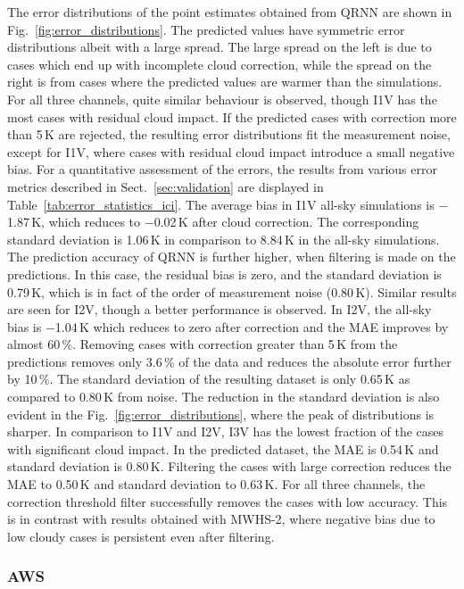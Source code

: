 \documentclass[amt, manuscript]{copernicus}
\begin{document}
The error distributions of the point estimates obtained from QRNN are shown in Fig.~\ref{fig:error_distributions}. The predicted values have symmetric error distributions albeit with a large spread. The large spread on the left is due to cases which end up with incomplete cloud correction, while the spread on the right is from cases where the predicted values are warmer than the simulations. For all three channels, quite similar behaviour is observed, though I1V has the most cases with residual cloud impact. If the predicted cases with correction more than 5\,K are rejected, the resulting error distributions fit the measurement noise, except for I1V, where cases with residual cloud impact introduce a small negative bias. For a quantitative assessment of the errors, the results from various error metrics described in  Sect.~\ref{sec:validation} are displayed in Table~\ref{tab:error_statistics_ici}. The average bias in I1V all-sky simulations is $-$1.87\,K, which reduces to $-$0.02\,K after cloud correction. The corresponding standard deviation is 1.06\,K in comparison to 8.84\,K in the all-sky simulations. The prediction accuracy of QRNN is further higher, when filtering is made on the predictions. In this case, the residual bias is zero, and the standard deviation is 0.79\,K, which is in fact of the order of measurement noise (0.80\,K). Similar results are seen for I2V, though a better performance is observed. In I2V, the all-sky bias is $-$1.04\,K which reduces to zero after correction and the MAE improves by almost 60\,\%. Removing cases with correction greater than 5\,K from the predictions removes only 3.6\,\% of the data and reduces the absolute error further by 10\,\%. The standard deviation of the resulting dataset is only 0.65\,K as compared to 0.80\,K from noise. The reduction in the standard deviation is also evident in the Fig.~\ref{fig:error_distributions}, where the peak of distributions is sharper. In comparison to I1V and I2V, I3V has the lowest fraction of the cases with significant cloud impact. In the predicted dataset, the MAE is 0.54\,K  and standard deviation is 0.80\,K. Filtering the cases with large correction reduces the MAE to 0.50\,K and standard deviation to 0.63\,K.  For all three channels, the correction threshold filter successfully removes the cases with low accuracy. This is in contrast with results obtained with MWHS-2, where negative bias due to low cloudy cases is persistent even after filtering. 


\subsubsection{AWS}
\end{document}
